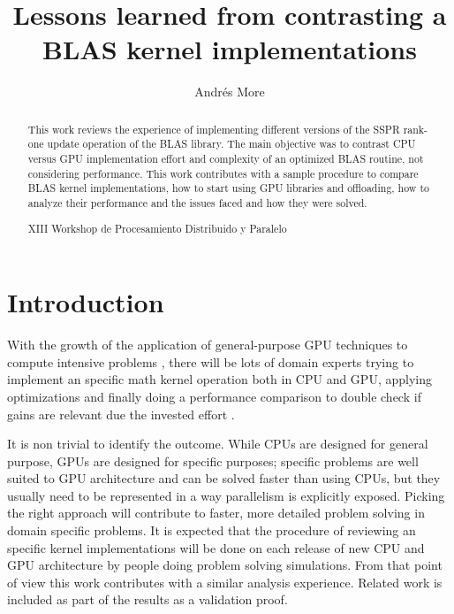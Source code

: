 \documentclass{llncs}
\begin{document}


\title{Lessons learned from contrasting a BLAS kernel implementations}
\author{Andrés More }


\maketitle

\begin{abstract}
This work reviews the experience of implementing different versions of the SSPR rank-one update operation
of the BLAS library. The main objective was to contrast CPU versus GPU implementation effort and complexity of an optimized BLAS routine, not considering performance. 
This work contributes with a sample procedure to compare BLAS kernel implementations,
how to start using GPU libraries and offloading, how to analyze their performance and
the issues faced and how they were solved.


XIII Workshop de Procesamiento Distribuido y Paralelo
\end{abstract}

\section{Introduction}

With the growth of the application of general-purpose GPU techniques to compute intensive problems \cite{gpgpu}, there will be lots of domain experts trying to implement an specific math kernel operation both in CPU and GPU, applying optimizations and finally doing a performance comparison to double check if gains are relevant due the invested effort \cite{gpuorg}.

\smallskip

It is non trivial to identify the outcome. While CPUs are designed for general purpose, GPUs are designed for specific purposes;  specific problems are well suited to GPU architecture and can be solved faster than using CPUs, but they
usually need to be represented in a way parallelism is explicitly exposed.
Picking the right approach will contribute to faster, more detailed problem solving in domain specific problems.
It is expected that the procedure of reviewing an specific kernel implementations will be done on each release of new CPU and GPU architecture by people doing problem solving simulations. From that point of view this work contributes with a similar analysis experience. Related work is included as part of the results as a validation proof.
\end{document}
